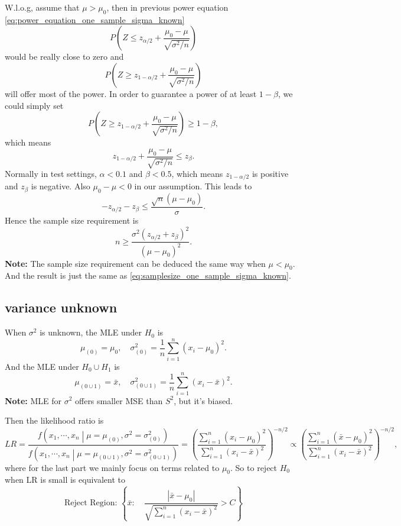 \documentclass[a4paper,12pt]{article}
\begin{document}
W.l.o.g, assume that $\mu > \mu_0$, then in previous power equation \eqref{eq:power_equation_one_sample_sigma_known}
\[
  P\left(
    Z
    \leq z_{\alpha / 2}
    + \frac{\mu_0 - \mu}{\sqrt{\sigma^2 / n}}
  \right)
\]
would be really close to zero and
\[
  P\left(
    Z
    \geq z_{1 - \alpha / 2}
    + \frac{\mu_0 - \mu}{\sqrt{\sigma^2 / n}}
  \right) 
\]
will offer most of the power. In order to guarantee a power of at least $1 - \beta$, we could simply set
\[
  P\left(
    Z
    \geq z_{1 - \alpha / 2}
    + \frac{\mu_0 - \mu}{\sqrt{\sigma^2 / n}}
  \right) \geq 1 - \beta
  ,
\]
which means
\[
  z_{1 - \alpha / 2} + \frac{\mu_0 - \mu}{\sqrt{\sigma^2 / n}} \leq z_{\beta}
  .
\]
Normally in test settings, $\alpha < 0.1$ and $\beta < 0.5$, which means $z_{1 - \alpha / 2}$ is positive and $z_\beta$ is negative. Also $\mu_0 - \mu < 0$ in our assumption. This leads to
\[
  - z_{\alpha / 2} - z_{\beta} \leq \frac{\sqrt{n}\left(\mu - \mu_0\right)}{\sigma}
  .
\]
Hence the sample size requirement is
\begin{equation}
  \label{eq:samplesize_one_sample_sigma_known}
  n \geq \frac{\sigma^2\left(z_{\alpha / 2} + z_{\beta}\right)^2}{\left(\mu - \mu_0\right)^2}
  .  
\end{equation}
\textbf{Note:} The sample size requirement can be deduced the same way when $\mu < \mu_0$. And the result is just the same as \eqref{eq:samplesize_one_sample_sigma_known}.

\subsection{variance unknown}
\label{sec:variance-unknown}

When $\sigma^2$ is unknown, the MLE under $H_0$ is
\[
  \mu_{\left(0\right)} = \mu_0
  ,\quad
  \sigma^2_{\left(0\right)} = \frac{1}{n}\sum\limits_{i = 1}^n\left(x_i - \mu_0\right)^2
  .
\]
And the MLE under $H_0\cup H_1$ is
\[
  \mu_{\left(0 \cup 1\right)} = \bar{x}
  ,\quad
  \sigma^2_{\left(0 \cup 1\right)} = \frac{1}{n}\sum\limits_{i = 1}^n\left(x_i - \bar{x}\right)^2
  .
\]
\textbf{Note: } MLE for $\sigma^2$ offers smaller MSE than $S^2$, but it's biased.
\par
Then the likelihood ratio is
\[
  LR = \frac{
    f\left(x_1, \cdots, x_n\middle|\mu = \mu_{\left(0\right)}, \sigma^2 = \sigma^2_{\left(0\right)}\right)
  }{
    f\left(x_1, \cdots, x_n\middle|\mu = \mu_{\left(0\cup 1\right)}, \sigma^2 = \sigma^2_{\left(0\cup 1\right)}\right)
  }
  = \left(
    \frac{
      \sum\limits_{i = 1}^n\left(x_i - \mu_0\right)^2
    }{
      \sum\limits_{i = 1}^n\left(x_i - \bar{x}\right)^2
    }
  \right)^{-n / 2}
  \propto \left(
    \frac{
      \sum\limits_{i = 1}^n\left(\bar{x} - \mu_0\right)^2
    }{
      \sum\limits_{i = 1}^n\left(x_i - \bar{x}\right)^2
    }
  \right)^{-n / 2}  
  ,
\]
where for the last part we mainly focus on terms related to $\mu_0$. So to reject $H_0$ when LR is small is equivalent to
\[
  \text{Reject Region: }
  \left\{
    \bar{x}
    :\quad
    \frac{\left|\bar{x}-\mu_0\right|}{\sqrt{\sum\limits_{i = 1}^n\left(x_i - \bar{x}\right)^2}} > C
  \right\}
\]
\end{document}
